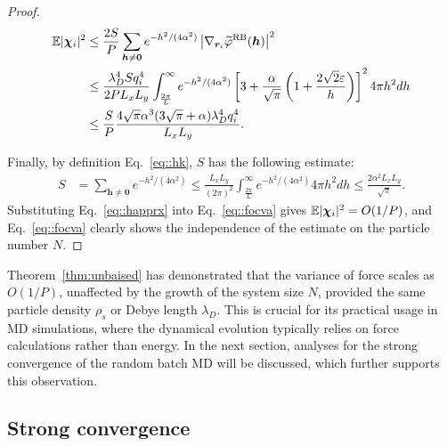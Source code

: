 \begin{proof}
	\begin{equation}\label{eq::focva}
		\begin{split}
			\mathbb{E}|\boldsymbol{\chi}_{i}|^2&\leq \frac{2S}{P}\sum_{\bm{h}\neq\bm{0}}e^{-h^2/(4\alpha^2)}\left|\nabla_{\bm{r}_i}\widetilde{\varphi}^{\text{RB}}(\bm{h})\right|^2\\
			&\leq \frac{\lambda_D^4 S q_i^4}{2PL_xL_y} \int_{\frac{2\pi}{L}}^{\infty}e^{-h^2/(4\alpha^2)}\left[3+\frac{\alpha}{\sqrt{\pi}}\left(1+\frac{2\sqrt{2}\varepsilon}{h}\right)\right]^24\pi h^2dh\\
			&\leq \frac{S}{P}\frac{4\sqrt{\pi}\alpha^3(3\sqrt{\pi}+\alpha)\lambda_D^4 q_{i}^4}{L_xL_y}.
		\end{split}
	\end{equation}
	
	Finally, by definition Eq.~\ref{eq::hk}, $S$ has the following estimate:
	\begin{equation}\label{eq::happrx}
		\begin{split}
			S &= \sum_{\bm{h}\neq\bm{0}}e^{-h^2/(4\alpha^2)}\leq \frac{L_xL_y}{(2\pi)^2}\int_{\frac{2\pi}{L}}^{\infty} e^{-h^2/(4\alpha^2)}4\pi h^2dh\leq \frac{2\alpha^2L_xL_y}{\sqrt{\pi}}.
		\end{split}
	\end{equation}
	Substituting Eq.~\eqref{eq::happrx} into Eq.~\eqref{eq::focva} gives $\mathbb{E}|\boldsymbol{\chi}_{i}|^2=O(1/P)$, and Eq.~\eqref{eq::focva} clearly shows the independence of the estimate on the particle number $N$.
\end{proof}


Theorem~\ref{thm:unbaised} has demonstrated that the variance of force scales as $O(1/P)$, unaffected by the growth of the system size $N$, provided the same particle density $\rho_s$ or Debye length $\lambda_D$. 
This is crucial for its practical usage in MD simulations, where the dynamical evolution typically relies on force calculations rather than energy. 
In the next section, analyses for the strong convergence of the random batch MD will be discussed, which further supports this observation.

\subsection{Strong convergence} \label{subsec::convergence}

